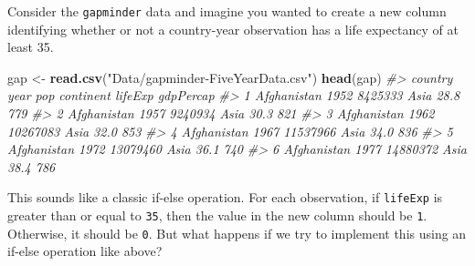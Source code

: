 \documentclass[]{book}
\newenvironment{Shaded}{\begin{snugshade}}{\end{snugshade}}
\newcommand{\KeywordTok}[1]{\textcolor[rgb]{0.13,0.29,0.53}{\textbf{#1}}}
\newcommand{\DataTypeTok}[1]{\textcolor[rgb]{0.13,0.29,0.53}{#1}}
\newcommand{\DecValTok}[1]{\textcolor[rgb]{0.00,0.00,0.81}{#1}}
\newcommand{\StringTok}[1]{\textcolor[rgb]{0.31,0.60,0.02}{#1}}
\newcommand{\CommentTok}[1]{\textcolor[rgb]{0.56,0.35,0.01}{\textit{#1}}}
\newcommand{\ControlFlowTok}[1]{\textcolor[rgb]{0.13,0.29,0.53}{\textbf{#1}}}
\newcommand{\OperatorTok}[1]{\textcolor[rgb]{0.81,0.36,0.00}{\textbf{#1}}}
\newcommand{\NormalTok}[1]{#1}
\begin{document}
Consider the \texttt{gapminder} data and imagine you wanted to create a
new column identifying whether or not a country-year observation has a
life expectancy of at least 35.

\begin{Shaded}
\begin{Highlighting}[]
\NormalTok{gap <-}\StringTok{ }\KeywordTok{read.csv}\NormalTok{(}\StringTok{"Data/gapminder-FiveYearData.csv"}\NormalTok{)}
\KeywordTok{head}\NormalTok{(gap)}
\CommentTok{#>       country year      pop continent lifeExp gdpPercap}
\CommentTok{#> 1 Afghanistan 1952  8425333      Asia    28.8       779}
\CommentTok{#> 2 Afghanistan 1957  9240934      Asia    30.3       821}
\CommentTok{#> 3 Afghanistan 1962 10267083      Asia    32.0       853}
\CommentTok{#> 4 Afghanistan 1967 11537966      Asia    34.0       836}
\CommentTok{#> 5 Afghanistan 1972 13079460      Asia    36.1       740}
\CommentTok{#> 6 Afghanistan 1977 14880372      Asia    38.4       786}
\end{Highlighting}
\end{Shaded}

This sounds like a classic if-else operation. For each observation, if
\texttt{lifeExp} is greater than or equal to \texttt{35}, then the value
in the new column should be \texttt{1}. Otherwise, it should be
\texttt{0}. But what happens if we try to implement this using an
if-else operation like above?

\begin{Shaded}
\end{Shaded}
\end{document}
